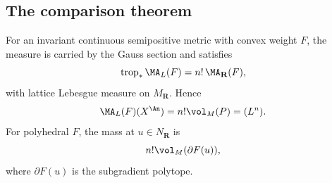 \subsection{The comparison theorem}
\label{sec:ch31-toric-theorem}

\begin{theorem}
\label{thm:toric-bfj-alexandrov}
For an invariant continuous semipositive metric with convex weight $F$,
the measure is carried by the Gauss section and satisfies
\begin{equation}
        \operatorname{trop}_*\MA_L(F)=n!\,\MA_{\mathbf R}(F),
\label{eq:toric-bfj-alexandrov}
\end{equation}
with lattice Lebesgue measure on $M_\mathbf R$.  Hence
\begin{equation}
        \MA_L(F)(X^{\An})=n!\vol_M(P)=(L^n).
\label{eq:toric-total-mass}
\end{equation}
For polyhedral $F$, the mass at $u\in N_\mathbf R$ is
\begin{equation}
                  n!\vol_M(\partial F(u)),
\label{eq:polyhedral-alexandrov-atom}
\end{equation}
where $\partial F(u)$ is the subgradient polytope.
\end{theorem}

